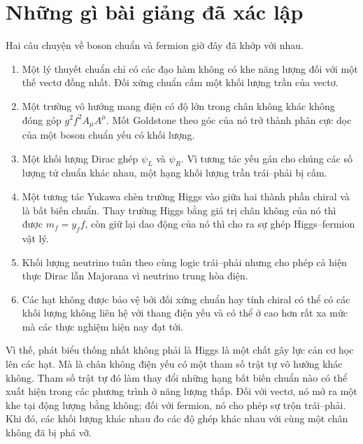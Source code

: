 \section{Những gì bài giảng đã xác lập}

Hai câu chuyện về boson chuẩn và fermion giờ đây đã khớp với nhau.

\begin{enumerate}
  \item Một lý thuyết chuẩn chỉ có các đạo hàm không có khe năng lượng đối với một thế vectơ đồng nhất. Đối xứng chuẩn cấm một khối lượng trần của vectơ.
  \item Một trường vô hướng mang điện có độ lớn trong chân không khác không đóng góp \(g^2f^2A_\mu A^\mu\). Mốt Goldstone theo góc của nó trở thành phân cực dọc của một boson chuẩn yếu có khối lượng.
  \item Một khối lượng Dirac ghép \(\psi_L\) và \(\psi_R\). Vì tương tác yếu gán cho chúng các số lượng tử chuẩn khác nhau, một hạng khối lượng trần trái--phải bị cấm.
  \item Một tương tác Yukawa chèn trường Higgs vào giữa hai thành phần chiral và là bất biến chuẩn. Thay trường Higgs bằng giá trị chân không của nó thì được \(m_f=y_ff\), còn giữ lại dao động của nó thì cho ra sự ghép Higgs--fermion vật lý.
  \item Khối lượng neutrino tuân theo cùng logic trái--phải nhưng cho phép cả hiện thực Dirac lẫn Majorana vì neutrino trung hòa điện.
  \item Các hạt không được bảo vệ bởi đối xứng chuẩn hay tính chiral có thể có các khối lượng không liên hệ với thang điện yếu và có thể ở cao hơn rất xa mức mà các thực nghiệm hiện nay đạt tới.
\end{enumerate}

Vì thế, phát biểu thống nhất không phải là Higgs là một chất gây lực cản cơ học lên các hạt. Mà là chân không điện yếu có một tham số trật tự vô hướng khác không. Tham số trật tự đó làm thay đổi những hạng bất biến chuẩn nào có thể xuất hiện trong các phương trình ở năng lượng thấp. Đối với vectơ, nó mở ra một khe tại động lượng bằng không; đối với fermion, nó cho phép sự trộn trái--phải. Khi đó, các khối lượng khác nhau đo các độ ghép khác nhau với cùng một chân không đã bị phá vỡ.
